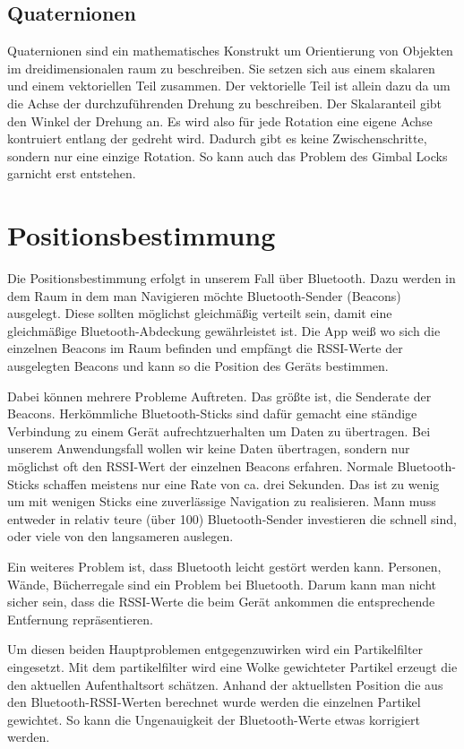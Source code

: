 \subsection{Quaternionen}
Quaternionen sind ein mathematisches Konstrukt um Orientierung von Objekten im dreidimensionalen raum zu beschreiben. Sie setzen sich aus einem skalaren und einem vektoriellen Teil zusammen. Der vektorielle Teil ist allein dazu da um die Achse der durchzuführenden Drehung zu beschreiben. Der Skalaranteil gibt den Winkel der Drehung an. Es wird also für jede Rotation eine eigene Achse kontruiert entlang der gedreht wird. Dadurch gibt es keine Zwischenschritte, sondern nur eine einzige Rotation. So kann auch das Problem des Gimbal Locks garnicht erst entstehen.

\section{Positionsbestimmung}
Die Positionsbestimmung erfolgt in unserem Fall über Bluetooth. Dazu werden in dem Raum in dem man Navigieren möchte Bluetooth-Sender (Beacons) ausgelegt. Diese sollten möglichst gleichmäßig verteilt sein, damit eine gleichmäßige Bluetooth-Abdeckung gewährleistet ist. Die App weiß wo sich die einzelnen Beacons im Raum befinden und empfängt die RSSI-Werte der ausgelegten Beacons und kann so die Position des Geräts bestimmen. 

Dabei können mehrere Probleme Auftreten. Das größte ist, die Senderate der Beacons. Herkömmliche Bluetooth-Sticks sind dafür gemacht eine ständige Verbindung zu einem Gerät aufrechtzuerhalten um Daten zu übertragen. Bei unserem Anwendungsfall wollen wir keine Daten übertragen, sondern nur möglichst oft den RSSI-Wert der einzelnen Beacons erfahren. Normale Bluetooth-Sticks schaffen meistens nur eine Rate von ca. drei Sekunden. Das ist zu wenig um mit wenigen Sticks eine zuverlässige Navigation zu realisieren. Mann muss entweder in relativ teure (über 100) Bluetooth-Sender investieren die schnell sind, oder viele von den langsameren auslegen.

Ein weiteres Problem ist, dass Bluetooth leicht gestört werden kann. Personen, Wände, Bücherregale sind ein Problem bei Bluetooth. Darum kann man nicht sicher sein, dass die RSSI-Werte die beim Gerät ankommen die entsprechende Entfernung repräsentieren. 

Um diesen beiden Hauptproblemen entgegenzuwirken wird ein Partikelfilter eingesetzt. Mit dem partikelfilter wird eine Wolke gewichteter Partikel erzeugt die den aktuellen Aufenthaltsort schätzen. Anhand der aktuellsten Position die aus den Bluetooth-RSSI-Werten berechnet wurde werden die einzelnen Partikel gewichtet. So kann die Ungenauigkeit der Bluetooth-Werte etwas korrigiert werden. \cite{wiki:001}